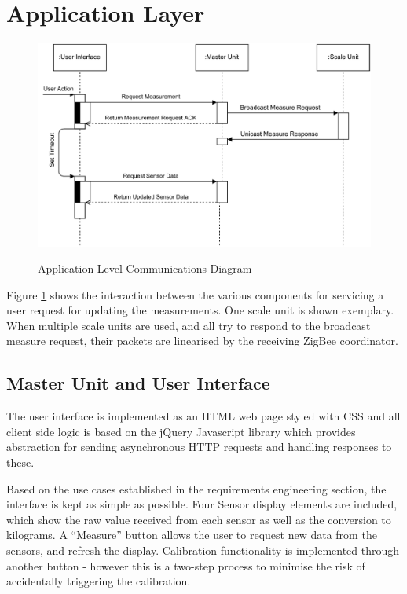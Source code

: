 \section{Application Layer}
\begin{figure}
\includegraphics[width=\textwidth]{images/communications-diagram.pdf}
\label{communications-diagram}
\caption{Application Level Communications Diagram}
\end{figure}
Figure \ref{communications-diagram} shows the interaction between the various components for servicing a user request for updating the measurements. One scale unit is shown exemplary. When multiple scale units are used, and all try to respond to the broadcast measure request, their packets are linearised by the receiving ZigBee coordinator.

\subsection{Master Unit and User Interface}
The user interface is implemented as an HTML web page styled with CSS and all client side logic is based on the jQuery Javascript library \cite{jquery} which provides abstraction for sending asynchronous HTTP requests and handling responses to these.

Based on the use cases established in the requirements engineering section, the interface is kept as simple as possible. Four Sensor display elements are included, which show the raw value received from each sensor as well as the conversion to kilograms. A ``Measure'' button allows the user to request new data from the sensors, and refresh the display. Calibration functionality is implemented through another button - however this is a two-step process to minimise the risk of accidentally triggering the calibration.

